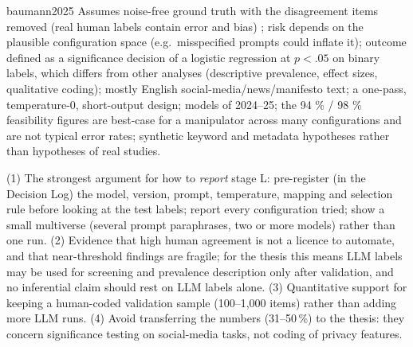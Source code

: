 \begin{papercard}{baumann2025}
 Assumes noise-free ground truth with the disagreement items removed (real human labels contain error and bias) ; risk depends on the plausible configuration space (e.g.\ misspecified prompts could inflate it); outcome defined as a significance decision of a logistic regression at $p<.05$ on binary labels, which differs from other analyses (descriptive prevalence, effect sizes, qualitative coding); mostly English social-media/news/manifesto text; a one-pass, temperature-0, short-output design; models of 2024--25; the 94 \% / 98 \% feasibility figures are best-case for a manipulator across many configurations and are not typical error rates; synthetic keyword and metadata hypotheses rather than hypotheses of real studies.

 (1) The strongest argument for how to \emph{report} stage L: pre-register (in the Decision Log) the model, version, prompt, temperature, mapping and selection rule before looking at the test labels; report every configuration tried; show a small multiverse (several prompt paraphrases, two or more models) rather than one run. (2) Evidence that high human agreement is not a licence to automate, and that near-threshold findings are fragile; for the thesis this means LLM labels may be used for screening and prevalence description only after validation, and no inferential claim should rest on LLM labels alone. (3) Quantitative support for keeping a human-coded validation sample (100--1,000 items) rather than adding more LLM runs. (4) Avoid transferring the numbers (31--50\,\%) to the thesis: they concern significance testing on social-media tasks, not coding of privacy features.
\end{papercard}
